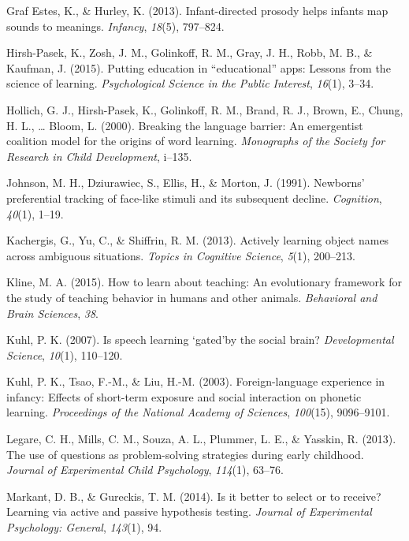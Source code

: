 \documentclass[a4paper,man,apacite,floatsintext]{apa6}
\begin{document}
\hypertarget{ref-graf2013infant}{}
Graf Estes, K., \& Hurley, K. (2013). Infant-directed prosody helps
infants map sounds to meanings. \emph{Infancy}, \emph{18}(5), 797--824.

\hypertarget{ref-hirsh2015putting}{}
Hirsh-Pasek, K., Zosh, J. M., Golinkoff, R. M., Gray, J. H., Robb, M.
B., \& Kaufman, J. (2015). Putting education in ``educational'' apps:
Lessons from the science of learning. \emph{Psychological Science in the
Public Interest}, \emph{16}(1), 3--34.

\hypertarget{ref-hollich2000breaking}{}
Hollich, G. J., Hirsh-Pasek, K., Golinkoff, R. M., Brand, R. J., Brown,
E., Chung, H. L., \ldots{} Bloom, L. (2000). Breaking the language
barrier: An emergentist coalition model for the origins of word
learning. \emph{Monographs of the Society for Research in Child
Development}, i--135.

\hypertarget{ref-johnson1991newborns}{}
Johnson, M. H., Dziurawiec, S., Ellis, H., \& Morton, J. (1991).
Newborns' preferential tracking of face-like stimuli and its subsequent
decline. \emph{Cognition}, \emph{40}(1), 1--19.

\hypertarget{ref-kachergis2013actively}{}
Kachergis, G., Yu, C., \& Shiffrin, R. M. (2013). Actively learning
object names across ambiguous situations. \emph{Topics in Cognitive
Science}, \emph{5}(1), 200--213.

\hypertarget{ref-kline2015learn}{}
Kline, M. A. (2015). How to learn about teaching: An evolutionary
framework for the study of teaching behavior in humans and other
animals. \emph{Behavioral and Brain Sciences}, \emph{38}.

\hypertarget{ref-kuhl2007speech}{}
Kuhl, P. K. (2007). Is speech learning `gated'by the social brain?
\emph{Developmental Science}, \emph{10}(1), 110--120.

\hypertarget{ref-kuhl2003foreign}{}
Kuhl, P. K., Tsao, F.-M., \& Liu, H.-M. (2003). Foreign-language
experience in infancy: Effects of short-term exposure and social
interaction on phonetic learning. \emph{Proceedings of the National
Academy of Sciences}, \emph{100}(15), 9096--9101.

\hypertarget{ref-legare2013use}{}
Legare, C. H., Mills, C. M., Souza, A. L., Plummer, L. E., \& Yasskin,
R. (2013). The use of questions as problem-solving strategies during
early childhood. \emph{Journal of Experimental Child Psychology},
\emph{114}(1), 63--76.

\hypertarget{ref-markant2014better}{}
Markant, D. B., \& Gureckis, T. M. (2014). Is it better to select or to
receive? Learning via active and passive hypothesis testing.
\emph{Journal of Experimental Psychology: General}, \emph{143}(1), 94.
\end{document}
